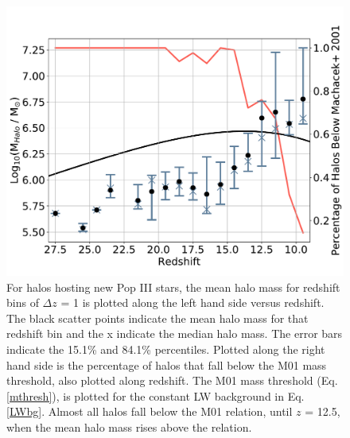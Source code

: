 \documentclass[a4paper,fleqn,usenatbib]{mnras}
\begin{document}
\begin{figure}
	\includegraphics[width=\columnwidth]{images/mean_mass_errorb_fix.pdf}
    \caption{For halos hosting new Pop III stars, the mean halo mass for redshift bins of $\Delta z$ = 1 is plotted along the left hand side versus redshift. The black scatter points indicate the mean halo mass for that redshift bin and the x indicate the median halo mass. The error bars indicate the 15.1\% and 84.1\% percentiles. Plotted along the right hand side is the percentage of halos that fall below the M01 mass threshold, also plotted along redshift. The M01 mass threshold (Eq. \ref{mthresh}), is plotted for the constant LW background in Eq. \ref{LWbg}. Almost all halos fall below the M01 relation, until $z$ = 12.5, when the mean halo mass rises above the relation.}
    \label{fig:mean_mass}
\end{figure}
\end{document}
